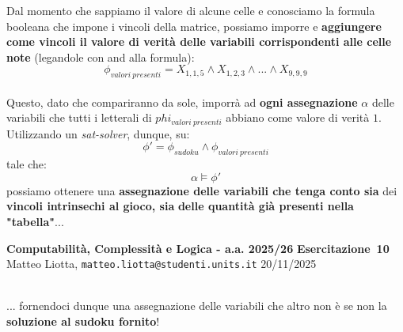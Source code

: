 \documentclass[a4paper,10pt]{article}
\makeatletter
\newcommand{\EsercitazioneNum}{10}
\newcommand{\Data}{20/11/2025}
\newcommand{\DocType}{Esercitazione} %
\newcommand{\FullTitle}{\DocType\ \EsercitazioneNum}
\newcommand{\Header}{
\noindent
  \small \textbf{Computabilità, Complessità e Logica - a.a. 2025/26} \hfill \textbf{\FullTitle} \\[0.2cm]
  \scriptsize Matteo Liotta, \texttt{matteo.liotta@studenti.units.it} \hfill \Data \\[0.2cm]
  \noindent\makebox[\linewidth]{\rule{\linewidth}{0.4pt}} \\[0.3cm]}
\newcommand{\NewPageHeader}{
  \vfill
  \noindent\makebox[\linewidth]{\rule{\linewidth}{0.4pt}}
  \newpage
  {\Header}
}
\makeatother
\begin{document}
{\begin{itemize}[label=, leftmargin=0pt]
\begin{osservazioni2}
\begin{center}
\end{center}

Dal momento che sappiamo il valore di alcune celle e conosciamo la formula booleana che impone i vincoli della matrice, possiamo imporre e \textbf{aggiungere come vincoli il valore di verità delle variabili corrispondenti alle celle note} (legandole con and alla formula):
$$\phi_{valori\ presenti} = X_{1,1,5} \land X_{1,2,3} \land ... \land X_{9,9,9}$$
\\
Questo, dato che compariranno da sole, imporrà ad \textbf{ogni assegnazione } $\alpha$ delle variabili che tutti i letterali di $phi_{valori\ presenti}$ abbiano come valore di verità $1$. Utilizzando un \textit{sat-solver}, dunque, su:
$$\phi'=\phi_{sudoku}\land \phi_{valori\ presenti}$$
tale che:
$$\alpha \models \phi'$$
possiamo ottenere una \textbf{assegnazione delle variabili che tenga conto sia} dei \textbf{vincoli intrinsechi al gioco, sia} \textbf{delle quantità già presenti nella "tabella"}...

\end{osservazioni2}
\NewPageHeader
\begin{osservazioni2}
... fornendoci dunque una assegnazione delle variabili che altro non è se non la \textbf{soluzione al sudoku fornito}! 

$$$$

\begin{center}
\end{center}
\end{osservazioni2}
\end{itemize}}
\end{document}
